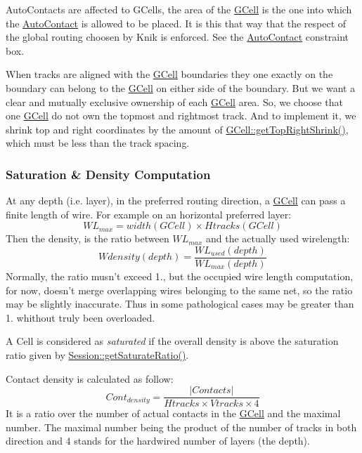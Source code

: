 Auto\-Contacts are affected to G\-Cells, the area of the \hyperlink{classKatabatic_1_1GCell}{G\-Cell} is the one into which the \hyperlink{classKatabatic_1_1AutoContact}{Auto\-Contact} is allowed to be placed. It is this that way that the respect of the global routing choosen by Knik is enforced. See the \hyperlink{classKatabatic_1_1AutoContact}{Auto\-Contact} constraint box.

When tracks are aligned with the \hyperlink{classKatabatic_1_1GCell}{G\-Cell} boundaries they one exactly on the boundary can belong to the \hyperlink{classKatabatic_1_1GCell}{G\-Cell} on either side of the boundary. But we want a clear and mutually exclusive ownership of each \hyperlink{classKatabatic_1_1GCell}{G\-Cell} area. So, we choose that one \hyperlink{classKatabatic_1_1GCell}{G\-Cell} do not own the topmost and rightmost track. And to implement it, we shrink top and right coordinates by the amount of \hyperlink{classKatabatic_1_1GCell_ac594cb2832ee7ef410c89499258d38fd}{G\-Cell\-::get\-Top\-Right\-Shrink()}, which must be less than the track spacing.\hypertarget{classKatabatic_1_1GCell_secGCellDensity}{}\subsubsection{Saturation \& Density Computation}\label{classKatabatic_1_1GCell_secGCellDensity}
At any depth (i.\-e. layer), in the preferred routing direction, a \hyperlink{classKatabatic_1_1GCell}{G\-Cell} can pass a finite length of wire. For example on an horizontal preferred layer\-: \[ WL_{max} = width(GCell) \times Htracks(GCell) \] Then the density, is the ratio between $WL_{max}$ and the actually used wirelength\-: \[ Wdensity(depth) = \frac{WL_{used}(depth)}{WL_{max}(depth)} \] Normally, the ratio musn't exceed 1., but the occupied wire length computation, for now, doesn't merge overlapping wires belonging to the same net, so the ratio may be slightly inaccurate. Thus in some pathological cases may be greater than 1. whithout truly been overloaded.

A Cell is considered as {\itshape saturated} if the overall density is above the saturation ratio given by \hyperlink{classKatabatic_1_1Session_a266a4079ca235e8fdb622ef4996d324d}{Session\-::get\-Saturate\-Ratio()}.

Contact density is calculated as follow\-: \[ Cont_{density} = \frac{|Contacts|}{Htracks \times Vtracks \times 4} \] It is a ratio over the number of actual contacts in the \hyperlink{classKatabatic_1_1GCell}{G\-Cell} and the maximal number. The maximal number being the product of the number of tracks in both direction and 4 stands for the hardwired number of layers (the depth).

